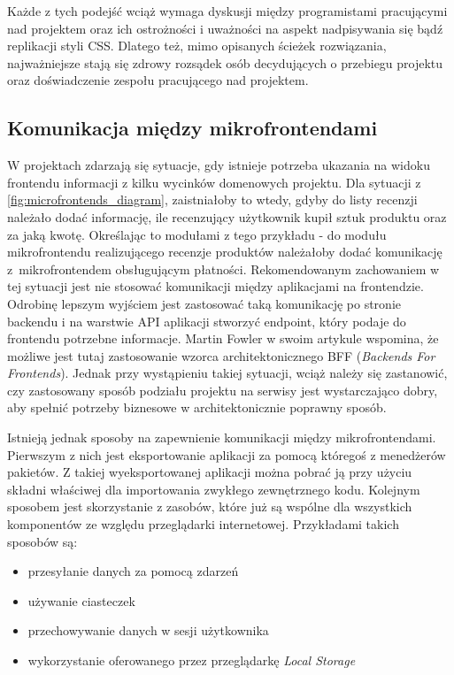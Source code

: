 \documentclass{SGGW-thesis}
\begin{document}
Każde z tych podejść wciąż wymaga dyskusji między programistami pracującymi nad projektem oraz ich ostrożności i uważności na aspekt nadpisywania się bądź replikacji styli CSS. Dlatego też, mimo opisanych ścieżek rozwiązania, najważniejsze stają się zdrowy rozsądek osób decydujących o przebiegu projektu oraz doświadczenie zespołu pracującego nad projektem.

\subsection{Komunikacja między mikrofrontendami}
W projektach zdarzają się sytuacje, gdy istnieje potrzeba ukazania na widoku frontendu informacji z kilku wycinków domenowych projektu. Dla sytuacji z  \cref{fig:microfrontends_diagram}, zaistniałoby to wtedy, gdyby do listy recenzji należało dodać informację, ile recenzujący użytkownik kupił sztuk produktu oraz za jaką kwotę. Określając to modułami z tego przykładu - do modułu mikrofrontendu realizującego recenzje produktów należałoby dodać komunikację z~mikrofrontendem obsługującym płatności. Rekomendowanym  zachowaniem w tej sytuacji jest nie stosować komunikacji między aplikacjami na frontendzie. Odrobinę lepszym wyjściem jest zastosować taką komunikację po stronie backendu i na warstwie API aplikacji stworzyć endpoint, który podaje do frontendu potrzebne informacje. Martin Fowler w swoim artykule \cite{fowler_2019} wspomina, że możliwe jest tutaj zastosowanie wzorca architektonicznego BFF (\textit{Backends For Frontends}). Jednak przy wystąpieniu takiej sytuacji, wciąż należy się zastanowić, czy zastosowany sposób podziału projektu na serwisy jest wystarczająco dobry, aby spełnić potrzeby biznesowe w architektonicznie poprawny sposób.

Istnieją jednak sposoby na zapewnienie komunikacji między mikrofrontendami. Pierwszym z nich jest eksportowanie aplikacji za pomocą któregoś z menedżerów pakietów. Z takiej wyeksportowanej aplikacji można pobrać ją przy użyciu składni właściwej dla importowania zwykłego zewnętrznego kodu.
Kolejnym sposobem jest skorzystanie z zasobów, które już są wspólne dla wszystkich komponentów ze względu przeglądarki internetowej. Przykładami takich sposobów są:

\begin{itemize}
  \item przesyłanie danych za pomocą zdarzeń
  \item używanie ciasteczek
  \item przechowywanie danych w sesji użytkownika
  \item wykorzystanie oferowanego przez przeglądarkę \textit{Local Storage}
\end{itemize}
\end{document}
